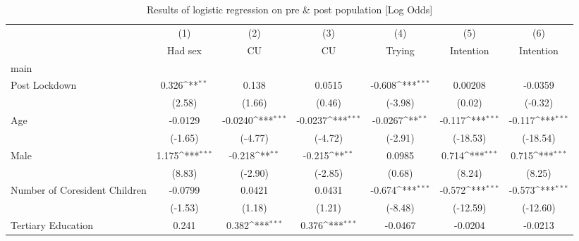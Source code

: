 \begin{table}[htbp]\centering
\def\sym#1{\ifmmode^{#1}\else\(^{#1}\)\fi}
\caption{Results of logistic regression on pre \& post population [Log Odds]}
\begin{tabular}{l*{6}{c}}
\hline\hline
                    &\multicolumn{1}{c}{(1)}&\multicolumn{1}{c}{(2)}&\multicolumn{1}{c}{(3)}&\multicolumn{1}{c}{(4)}&\multicolumn{1}{c}{(5)}&\multicolumn{1}{c}{(6)}\\
                    &\multicolumn{1}{c}{Had sex}&\multicolumn{1}{c}{CU}&\multicolumn{1}{c}{CU}&\multicolumn{1}{c}{Trying}&\multicolumn{1}{c}{Intention}&\multicolumn{1}{c}{Intention}\\
\hline
main                &                     &                     &                     &                     &                     &                     \\
Post Lockdown       &       0.326\sym{**} &       0.138         &      0.0515         &      -0.608\sym{***}&     0.00208         &     -0.0359         \\
                    &      (2.58)         &      (1.66)         &      (0.46)         &     (-3.98)         &      (0.02)         &     (-0.32)         \\
[1em]
Age                 &     -0.0129         &     -0.0240\sym{***}&     -0.0237\sym{***}&     -0.0267\sym{**} &      -0.117\sym{***}&      -0.117\sym{***}\\
                    &     (-1.65)         &     (-4.77)         &     (-4.72)         &     (-2.91)         &    (-18.53)         &    (-18.54)         \\
[1em]
Male                &       1.175\sym{***}&      -0.218\sym{**} &      -0.215\sym{**} &      0.0985         &       0.714\sym{***}&       0.715\sym{***}\\
                    &      (8.83)         &     (-2.90)         &     (-2.85)         &      (0.68)         &      (8.24)         &      (8.25)         \\
[1em]
Number of Coresident Children&     -0.0799         &      0.0421         &      0.0431         &      -0.674\sym{***}&      -0.572\sym{***}&      -0.573\sym{***}\\
                    &     (-1.53)         &      (1.18)         &      (1.21)         &     (-8.48)         &    (-12.59)         &    (-12.60)         \\
[1em]
Tertiary Education  &       0.241         &       0.382\sym{***}&       0.376\sym{***}&     -0.0467         &     -0.0204         &     -0.0213         \\

\end{tabular}
\end{table}
